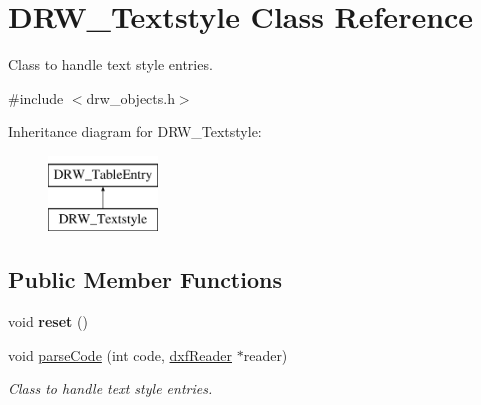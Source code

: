 \hypertarget{classDRW__Textstyle}{\section{D\-R\-W\-\_\-\-Textstyle Class Reference}
\label{classDRW__Textstyle}
}


Class to handle text style entries.  




{\ttfamily \#include $<$drw\-\_\-objects.\-h$>$}

Inheritance diagram for D\-R\-W\-\_\-\-Textstyle\-:\begin{figure}[H]
\begin{center}
\leavevmode
\includegraphics[height=2.000000cm]{classDRW__Textstyle}
\end{center}
\end{figure}
\subsection*{Public Member Functions}
\begin{DoxyCompactItemize}
\item 
\hypertarget{classDRW__Textstyle_a90263566cb080c5757b8a9f7ec1258c9}{void {\bfseries reset} ()}\label{classDRW__Textstyle_a90263566cb080c5757b8a9f7ec1258c9}

\item 
void \hyperlink{classDRW__Textstyle_a05f7de5ef7082ac33bbc61908dfc7c24}{parse\-Code} (int code, \hyperlink{classdxfReader}{dxf\-Reader} $\ast$reader)
\begin{DoxyCompactList}\small\item\em Class to handle text style entries. \end{DoxyCompactList}\end{DoxyCompactItemize}
